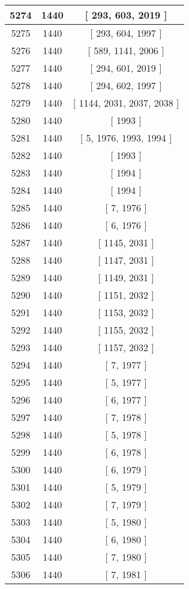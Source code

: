 \begin{center}
\begin{longtable}[H]{|| c c c ||}
\hline
5274 & 1440 & [ 293, 603, 2019 ] \\ 
\hline
5275 & 1440 & [ 293, 604, 1997 ] \\ 
\hline
5276 & 1440 & [ 589, 1141, 2006 ] \\ 
\hline
5277 & 1440 & [ 294, 601, 2019 ] \\ 
\hline
5278 & 1440 & [ 294, 602, 1997 ] \\ 
\hline
5279 & 1440 & [ 1144, 2031, 2037, 2038 ] \\ 
\hline
5280 & 1440 & [ 1993 ] \\ 
\hline
5281 & 1440 & [ 5, 1976, 1993, 1994 ] \\ 
\hline
5282 & 1440 & [ 1993 ] \\ 
\hline
5283 & 1440 & [ 1994 ] \\ 
\hline
5284 & 1440 & [ 1994 ] \\ 
\hline
5285 & 1440 & [ 7, 1976 ] \\ 
\hline
5286 & 1440 & [ 6, 1976 ] \\ 
\hline
5287 & 1440 & [ 1145, 2031 ] \\ 
\hline
5288 & 1440 & [ 1147, 2031 ] \\ 
\hline
5289 & 1440 & [ 1149, 2031 ] \\ 
\hline
5290 & 1440 & [ 1151, 2032 ] \\ 
\hline
5291 & 1440 & [ 1153, 2032 ] \\ 
\hline
5292 & 1440 & [ 1155, 2032 ] \\ 
\hline
5293 & 1440 & [ 1157, 2032 ] \\ 
\hline
5294 & 1440 & [ 7, 1977 ] \\ 
\hline
5295 & 1440 & [ 5, 1977 ] \\ 
\hline
5296 & 1440 & [ 6, 1977 ] \\ 
\hline
5297 & 1440 & [ 7, 1978 ] \\ 
\hline
5298 & 1440 & [ 5, 1978 ] \\ 
\hline
5299 & 1440 & [ 6, 1978 ] \\ 
\hline
5300 & 1440 & [ 6, 1979 ] \\ 
\hline
5301 & 1440 & [ 5, 1979 ] \\ 
\hline
5302 & 1440 & [ 7, 1979 ] \\ 
\hline
5303 & 1440 & [ 5, 1980 ] \\ 
\hline
5304 & 1440 & [ 6, 1980 ] \\ 
\hline
5305 & 1440 & [ 7, 1980 ] \\ 
\hline
5306 & 1440 & [ 7, 1981 ] \\ 

\end{longtable}
\end{center}

